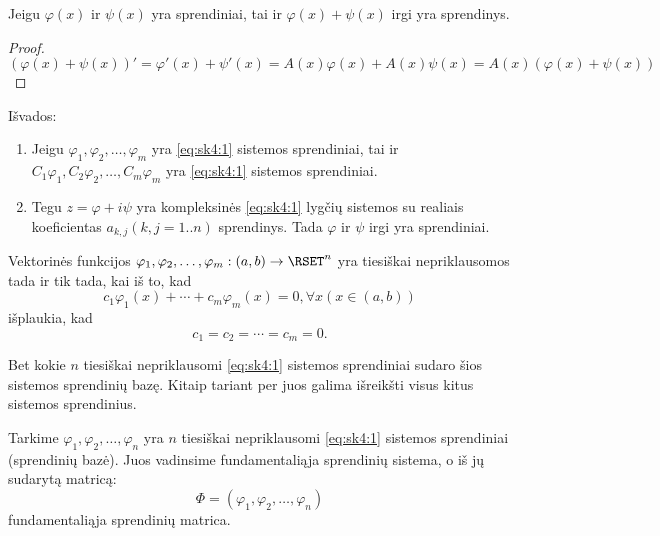 \begin{prop}
  Jeigu $\varphi(x)$ ir $\psi(x)$ yra sprendiniai, tai ir
  $\varphi(x) + \psi(x)$ irgi yra sprendinys.
  \begin{proof}
    \begin{equation*}
      (\varphi(x) + \psi(x))' =%
      \varphi'(x) + \psi'(x) =%
      A(x)\varphi(x) + A(x)\psi(x) =%
      A(x)(\varphi(x) + \psi(x))
    \end{equation*} 
  \end{proof}
\end{prop}

Išvados:
\begin{enumerate}
  \item Jeigu $\varphi_{1},\varphi_{2},\ldots,\varphi_{m}$ yra
    \ref{eq:sk4:1} sistemos sprendiniai, tai ir
    $C_{1}\varphi_{1}, C_{2}\varphi_{2},\ldots,C_{m}\varphi_{m}$
    yra \ref{eq:sk4:1} sistemos sprendiniai.
  \item Tegu $z = \varphi + i \psi$ yra kompleksinės \ref{eq:sk4:1}
    lygčių sistemos su realiais koeficientas $a_{k,j} (k,j = 1..n)$
    sprendinys. Tada $\varphi$ ir $\psi$ irgi yra sprendiniai.
\end{enumerate}

\begin{defn}
  Vektorinės funkcijos
  $\varphi_{1}, \varphi_{2}, \ldots, \varphi_{m} : (a, b) \to \RSET^{n}$
  yra tiesiškai nepriklausomos tada ir tik tada, kai iš to, kad
  \begin{equation*}
    c_{1}\varphi_{1}(x) + \cdots + c_{m}\varphi_{m}(x) = 0,%
    \forall x (x \in (a, b))
  \end{equation*}
  išplaukia, kad
  \begin{equation*}
    c_{1} = c_{2} = \cdots = c_{m} = 0.
  \end{equation*}
\end{defn}

\begin{prop}
  Bet kokie $n$ tiesiškai nepriklausomi \ref{eq:sk4:1} sistemos
  sprendiniai sudaro šios sistemos sprendinių bazę. Kitaip tariant
  per juos galima išreikšti visus kitus sistemos sprendinius.
\end{prop}

\begin{defn}
  Tarkime $\varphi_{1}, \varphi_{2}, \ldots, \varphi_{n}$ yra
  $n$ tiesiškai nepriklausomi \ref{eq:sk4:1} sistemos sprendiniai
  (sprendinių bazė). Juos vadinsime fundamentaliąja sprendinių
  sistema, o iš jų sudarytą matricą:
  \begin{equation*}
    \Phi = \left( \varphi_{1}, \varphi_{2}, \ldots, \varphi_{n} \right)
  \end{equation*}
  fundamentaliąja sprendinių matrica.
\end{defn}

